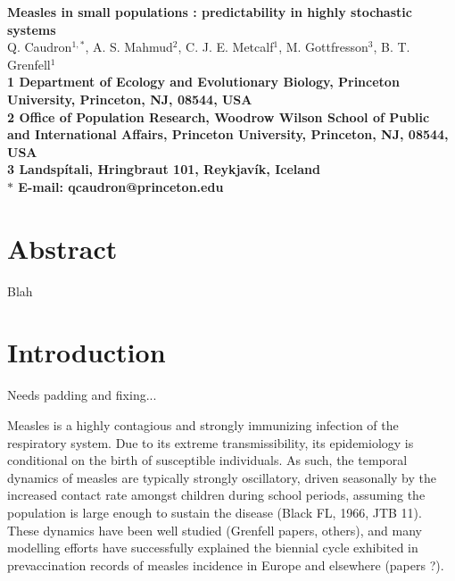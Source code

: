 \documentclass[10pt]{article}
\date{}
\begin{document}
\begin{flushleft}
{\Large
\textbf{Measles in small populations : predictability in highly stochastic systems}
}
\\
Q. Caudron$^{1,\ast}$, 
A. S. Mahmud$^{2}$, 
C. J. E. Metcalf$^{1}$,
M. Gottfre{\dh}sson$^3$,
B. T. Grenfell$^{1}$
\\
\bf{1} Department of Ecology and Evolutionary Biology, Princeton University, Princeton, NJ, 08544, USA
\\
\bf{2} Office of Population Research, Woodrow Wilson School of Public and International Affairs, Princeton University, Princeton, NJ, 08544, USA
\\
\bf{3} Landsp\'{i}tali, Hringbraut 101, Reykjav\'{i}k, Iceland
\\
$\ast$ E-mail: qcaudron@princeton.edu
\end{flushleft}













\section*{Abstract}

Blah
















\section*{Introduction}

Needs padding and fixing...

Measles is a highly contagious and strongly immunizing infection of the respiratory system. Due to its extreme transmissibility, its epidemiology is conditional on the birth of susceptible individuals. As such, the temporal dynamics of measles are typically strongly oscillatory, driven seasonally by the increased contact rate amongst children during school periods, assuming the population is large enough to sustain the disease (Black FL, 1966, JTB 11). These dynamics have been well studied (Grenfell papers, others), and many modelling efforts have successfully explained the biennial cycle exhibited in prevaccination records of measles incidence in Europe and elsewhere (papers ?). 
\end{document}
